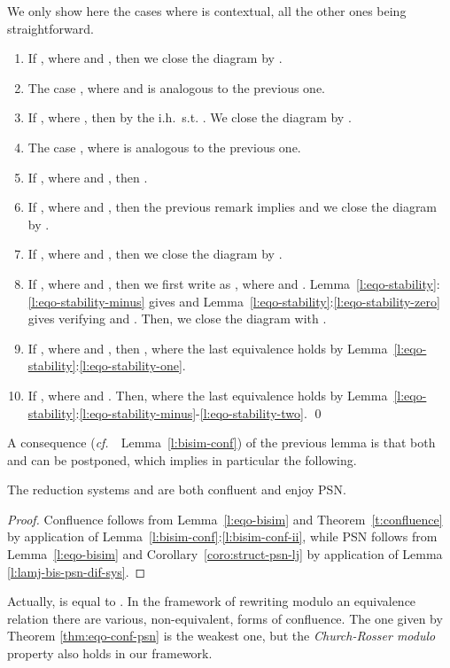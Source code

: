\documentclass{LMCS}
\newcommand{\cf}{{\it  cf.}~}
\renewcommand{\>}{\rightarrow}
\newcommand{\ih}{i.h.}
\begin{document}
We only show here the cases where  is contextual, all the other ones being straightforward. 
\begin{enumerate}[]
\item If ,
where  and ,  then we close the diagram by . 
\item The case ,
where  and  is analogous to the previous  one.
\item If , 
where , then by the \ih\  s.t. . 
We close the diagram by  .
\item The case ,
where  is analogous to the previous one.
\item If , where
 and ,  then .
\item If , where 
       and ,  then the previous remark implies
       and we close the diagram by  .
\item If , where  and , then we
  close the diagram by .
\item  If , where  and , then
  we first write  as , where
   and .
  Lemma~\ref{l:eqo-stability}:\ref{l:eqo-stability-minus}
  gives
   and Lemma~\ref{l:eqo-stability}:\ref{l:eqo-stability-zero}
  gives  verifying  and 
  . 
  Then, we close the diagram with
  .
\item If , where  and , then  ,  where the last equivalence 
  holds by Lemma~\ref{l:eqo-stability}:\ref{l:eqo-stability-one}.
\item If ,
  where  and . Then,  where the last equivalence holds by
  Lemma~\ref{l:eqo-stability}:\ref{l:eqo-stability-minus}-\ref{l:eqo-stability-two}.
\qed\medskip
\end{enumerate}

\noindent A consequence (\cf\ Lemma~\ref{l:bisim-conf}) of the previous lemma is that
both  and   can be postponed, which implies in particular the following.

\begin{thm}
\label{thm:eqo-conf-psn}
The reduction systems  
and  are both confluent and enjoy PSN.
\end{thm}



\begin{proof}
Confluence follows from Lemma~\ref{l:eqo-bisim} and
Theorem~\ref{t:confluence} by application of
Lemma~\ref{l:bisim-conf}:\ref{l:bisim-conf-ii}, while PSN follows from
Lemma~\ref{l:eqo-bisim} and Corollary~\ref{coro:struct-psn-lj} by
application of Lemma \ref{l:lamj-bis-psn-dif-sys}.
\end{proof}


Actually,  is equal to . In
  the framework of rewriting modulo an equivalence relation there are
  various, non-equivalent, forms of confluence. The one given by Theorem \ref{thm:eqo-conf-psn} is
  the weakest one, but the 
  \textit{Church-Rosser modulo} property also holds in our framework. 
\end{document}
